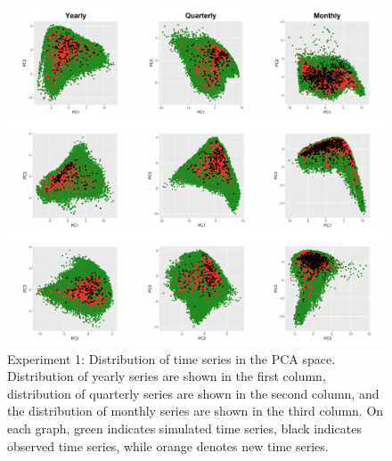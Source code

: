 \documentclass[11pt,a4paper,]{article}
\begin{document}
\begin{figure}

{\centering \includegraphics[width=\textwidth]{figure/exp1pca-1} 

}

\caption{Experiment 1: Distribution of time series in the PCA space. Distribution of yearly series are shown in the first column, distribution of quarterly series are shown in the second column, and the distribution of monthly series are shown in the third column. On each graph, green indicates simulated time series, black indicates observed time series, while orange denotes new time series.}\label{fig:exp1pca}
\end{figure}
\end{document}
